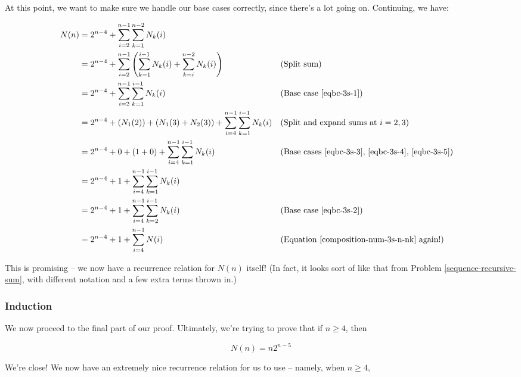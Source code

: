 
At this point, we want to make sure we handle our base cases correctly, since there's a lot going on. Continuing, we have:


\begin{align*}
N(n) &= 2^{n-4} + \sum_{i=2}^{n-1} \sum_{k=1}^{n-2} N_{k}(i) \\
&= 2^{n-4} + \sum_{i=2}^{n-1} \left( \sum_{k=1}^{i-1} N_{k}(i) + \sum_{k=i}^{n-2} N_{k}(i) \right) && \text{(Split sum)} \\
&= 2^{n-4} + \sum_{i=2}^{n-1} \sum_{k=1}^{i-1} N_{k}(i) && \text{(Base case \ref{eqbc-3s-1})} \\
&= 2^{n-4} + \left( N_1(2) \right) + \left( N_1(3) + N_2(3) \right) + \sum_{i=4}^{n-1} \sum_{k=1}^{i-1} N_{k}(i) && \text{(Split and expand sums at $i=2,3$)} \\
&= 2^{n-4} + 0 + \left( 1 + 0 \right) + \sum_{i=4}^{n-1} \sum_{k=1}^{i-1} N_{k}(i) && \text{(Base cases \ref{eqbc-3s-3}, \ref{eqbc-3s-4}, \ref{eqbc-3s-5})} \\
&= 2^{n-4} + 1 + \sum_{i=4}^{n-1} \sum_{k=1}^{i-1} N_{k}(i) \\
&= 2^{n-4} + 1 + \sum_{i=4}^{n-1} \sum_{k=2}^{i-1} N_{k}(i) && \text{(Base case \ref{eqbc-3s-2})} \\
&= 2^{n-4} + 1 + \sum_{i=4}^{n-1} N(i) && \text{(Equation \ref{composition-num-3s-n-nk} again!)} \\
\end{align*}

This is promising -- we now have a recurrence relation for $N(n)$ itself! (In fact, it looks sort of like that from Problem \ref{sequence-recursive-sum}, with different notation and a few extra terms thrown in.)


\subsubsection{Induction}

We now proceed to the final part of our proof. Ultimately, we're trying to prove that if $n \geq 4$, then 

\begin{equation*}
N(n) = n2^{n-5}
\end{equation*}

We're close! We now have an extremely nice recurrence relation for us to use -- namely, when $n \geq 4$,

